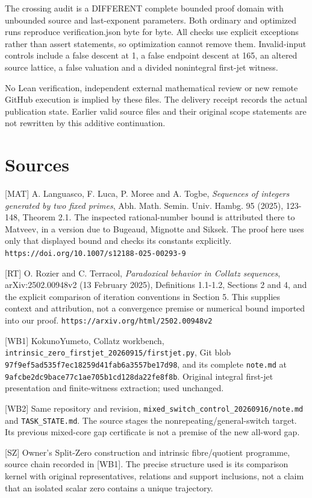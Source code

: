 The crossing audit is a DIFFERENT complete bounded proof domain with
unbounded source and last-exponent parameters. Both ordinary and
optimized runs reproduce verification.json byte for byte. All checks use
explicit exceptions rather than assert statements, so optimization
cannot remove them. Invalid-input controls include a false descent at 1,
a false endpoint descent at 165, an altered source lattice, a false
valuation and a divided nonintegral first-jet witness.

No Lean verification, independent external mathematical review or new
remote GitHub execution is implied by these files. The delivery receipt
records the actual publication state. Earlier valid source files and
their original scope statements are not rewritten by this additive
continuation.

\section{Sources}

{[}MAT{]} A. Languasco, F. Luca, P. Moree and A. Togbe, \emph{Sequences
of integers generated by two fixed primes}, Abh. Math. Semin. Univ.
Hambg. 95 (2025), 123-148, Theorem 2.1. The inspected rational-number
bound is attributed there to Matveev, in a version due to Bugeaud,
Mignotte and Siksek. The proof here uses only that displayed bound and
checks its constants explicitly.
\nolinkurl{https://doi.org/10.1007/s12188-025-00293-9}

{[}RT{]} O. Rozier and C. Terracol, \emph{Paradoxical behavior in
Collatz sequences}, arXiv:2502.00948v2 (13 February 2025), Definitions
1.1-1.2, Sections 2 and 4, and the explicit comparison of iteration
conventions in Section 5. This supplies context and attribution, not a
convergence premise or numerical bound imported into our proof.
\nolinkurl{https://arxiv.org/html/2502.00948v2}

{[}WB1{]} KokunoYumeto, Collatz workbench,
\nolinkurl{intrinsic_zero_firstjet_20260915/firstjet.py}, Git blob
\nolinkurl{97f9ef5ad535f7ec18259d41fab6a3557be17d98}, and its complete
\nolinkurl{note.md} at
\nolinkurl{9afcbe2dc9bace77c1ae705b1cd128da22fe8f8b}. Original integral
first-jet presentation and finite-witness extraction; used unchanged.

{[}WB2{]} Same repository and revision,
\nolinkurl{mixed_switch_control_20260916/note.md} and
\nolinkurl{TASK_STATE.md}. The source stages the
nonrepeating/general-switch target. Its previous mixed-core gap
certificate is not a premise of the new all-word gap.

{[}SZ{]} Owner's Split-Zero construction and intrinsic fibre/quotient
programme, source chain recorded in {[}WB1{]}. The precise structure
used is its comparison kernel with original representatives, relations
and support inclusions, not a claim that an isolated scalar zero
contains a unique trajectory.
